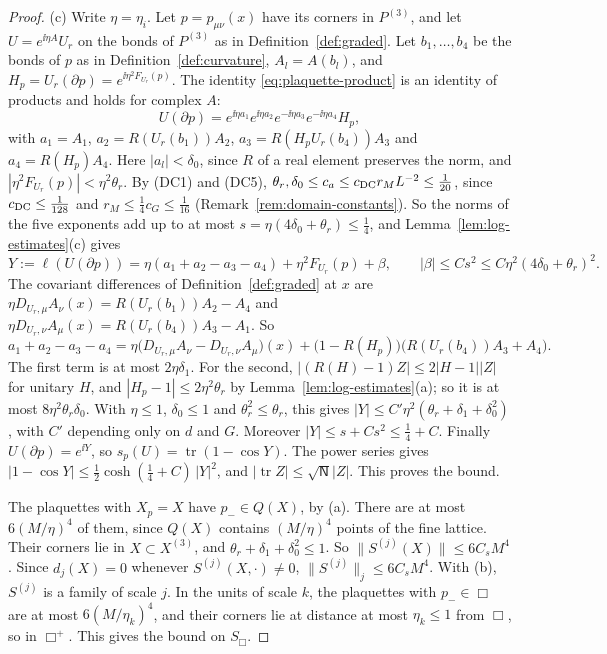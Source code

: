 \begin{proof}
(c) Write $\eta=\eta_i$. Let $p=p_{\mu\nu}(x)$ have its corners in $P^{(3)}$, and let $U=e^{\ii\eta A}U_r$ on the bonds of $P^{(3)}$ as in Definition~\ref{def:graded}. Let $b_1,\dots,b_4$ be the bonds of $p$ as in Definition~\ref{def:curvature}, $A_l=A(b_l)$, and $H_p=U_r(\partial p)=e^{\ii\eta^2F_{U_r}(p)}$. The identity \eqref{eq:plaquette-product} is an identity of products and holds for complex $A$:
\[
U(\partial p)=e^{\ii\eta a_1}e^{\ii\eta a_2}e^{-\ii\eta a_3}e^{-\ii\eta a_4}H_p,
\]
with $a_1=A_1$, $a_2=R(U_r(b_1))A_2$, $a_3=R(H_pU_r(b_4))A_3$ and $a_4=R(H_p)A_4$. Here $|a_l|<\delta_0$, since $R$ of a real element preserves the norm, and $|\eta^2F_{U_r}(p)|<\eta^2\theta_r$. By (DC1) and (DC5), $\theta_r,\delta_0\le c_a\le c_{\rm DC}r_ML^{-2}\le\frac1{20}$, since $c_{\rm DC}\le\frac1{128}$ and $r_M\le\frac14c_G\le\frac1{16}$ (Remark~\ref{rem:domain-constants}). So the norms of the five exponents add up to at most $s=\eta(4\delta_0+\theta_r)\le\frac14$, and Lemma~\ref{lem:log-estimates}(c) gives
\[
Y:=\ell(U(\partial p))=\eta(a_1+a_2-a_3-a_4)+\eta^2F_{U_r}(p)+\beta,\qquad|\beta|\le Cs^2\le C\eta^2(4\delta_0+\theta_r)^2 .
\]
The covariant differences of Definition~\ref{def:graded} at $x$ are $\eta D_{U_r,\mu}A_\nu(x)=R(U_r(b_1))A_2-A_4$ and $\eta D_{U_r,\nu}A_\mu(x)=R(U_r(b_4))A_3-A_1$. So
\[
a_1+a_2-a_3-a_4=\eta\big(D_{U_r,\mu}A_\nu-D_{U_r,\nu}A_\mu\big)(x)+\big(1-R(H_p)\big)\big(R(U_r(b_4))A_3+A_4\big).
\]
The first term is at most $2\eta\delta_1$. For the second, $|(R(H)-1)Z|\le2|H-1||Z|$ for unitary $H$, and $|H_p-1|\le2\eta^2\theta_r$ by Lemma~\ref{lem:log-estimates}(a); so it is at most $8\eta^2\theta_r\delta_0$. With $\eta\le1$, $\delta_0\le1$ and $\theta_r^2\le\theta_r$, this gives $|Y|\le C'\eta^2(\theta_r+\delta_1+\delta_0^2)$, with $C'$ depending only on $d$ and $G$. Moreover $|Y|\le s+Cs^2\le\frac14+C$. Finally $U(\partial p)=e^{\ii Y}$, so $s_p(U)=\operatorname{tr}(1-\cos Y)$. The power series gives $|1-\cos Y|\le\frac12\cosh(\frac14+C)\,|Y|^2$, and $|\operatorname{tr}Z|\le\sqrt{\mathsf N}|Z|$. This proves the bound.

The plaquettes with $X_p=X$ have $p_-\in Q(X)$, by (a). There are at most $6(M/\eta)^4$ of them, since $Q(X)$ contains $(M/\eta)^4$ points of the fine lattice. Their corners lie in $X\subset X^{(3)}$, and $\theta_r+\delta_1+\delta_0^2\le1$. So $\|S^{(j)}(X)\|\le6C_sM^4$. Since $d_j(X)=0$ whenever $S^{(j)}(X,\cdot)\ne0$, $\|S^{(j)}\|_j\le6C_sM^4$. With (b), $S^{(j)}$ is a family of scale $j$. In the units of scale $k$, the plaquettes with $p_-\in\Box$ are at most $6(M/\eta_k)^4$, and their corners lie at distance at most $\eta_k\le1$ from $\Box$, so in $\Box^+$. This gives the bound on $S_\Box$.


\end{proof}
